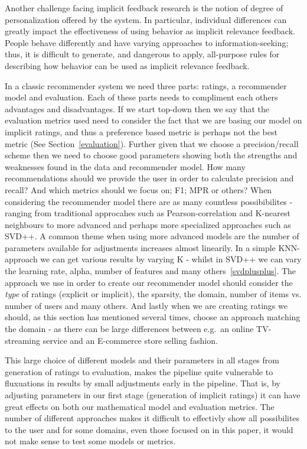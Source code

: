 Another challenge facing implicit feedback research is the notion of degree of
personalization offered by the system. In particular, individual differences
can greatly impact the effectiveness of using behavior as implicit relevance
feedback. People behave differently and have varying approaches to
information-seeking; thus, it is difficult to generate, and dangerous to apply,
all-purpose rules for describing how behavior can be used as implicit relevance
feedback.

In a classic recommender system we need three parts: ratings, a recommender
model and evaluation. Each of these parts needs to compliment each others
advantages and disadvantages. If we start top-down then we say that the
evaluation metrics used need to consider the fact that we are basing our model
on implicit ratings, and thus a preference based metric is perhaps not the best
metric (See Section~\ref{evaluation}). Further given that we choose a
precision/recall scheme then we need to choose good parameters showing both the
strengths and weaknesses found in the data and recommender model. How many
recommendations should we provide the user in order to calculate precision and
recall? And which metrics should we focus on; F1; MPR or others?
When considering the recommender model there are as many countless
possibibilites - ranging from traditional approcahes such as
Pearson-correlation and K-nearest neighbours to more advanced and perhaps more
specialized approaches such as SVD++. A common theme when using more advanced
models are the number of parameters available for adjustments increases almost
linearily. In a simple KNN-approach we can get various results by varying K -
whilst in SVD++ we can vary the learning rate, alpha, number of features and
many others~\ref{svdplusplus}. The approach we use in order to create our
recommender model should consider the \textit{type} of ratings (explicit or
implicit), the sparsity, the domain, number of items vs. number of users and
many others. And lastly when we are creating ratings we should, as this section
has mentioned several times, choose an approach matching the domain - as there
can be large differences between e.g.\ an online TV-streaming service and an
E-commerce store selling fashion.


This large choice of different models and their parameters in all stages from
generation of ratings to evaluation, makes the pipeline quite vulnerable to
fluxuations in results by small adjustments early in the pipeline. That is, by
adjusting parameters in our first stage (generation of implicit ratings) it can
have great effects on both our mathematical model and evaluation metrics. The
number of different approaches makes it difficult to effectivly show all
possibilites to the user and for some domains, even those focused on in this
paper, it would not make sense to test some models or metrics.

